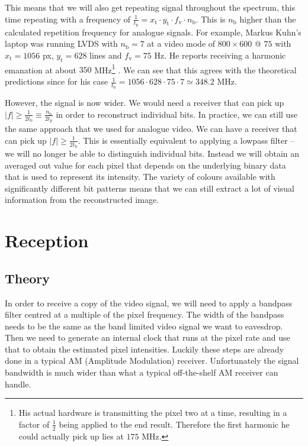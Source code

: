 \documentclass[a4paper,12pt,twoside,openright]{report}
\begin{document}
This means that we will also get repeating signal throughout the spectrum, this time repeating with a frequency of $\frac{1}{t_\text{b}} = x_\text{t} \cdot y_\text{t} \cdot f_\text{v} \cdot n_\text{b}$. This is $n_\text{b}$ higher than the calculated repetition frequency for analogue signals. For example, Markus Kuhn's laptop was running LVDS with $n_\text{b}=7$ at a video mode of $800 \times 600 $ @ $ 75$ with $x_\text{t} = 1056$ px, $y_\text{t} = 628$ lines and $f_\text{v} = 75$ Hz. He reports receiving a harmonic emanation at about $350$ MHz\footnote{His actual hardware is transmitting the pixel two at a time, resulting in a factor of $\frac{1}{2}$ being applied to the end result. Therefore the first harmonic he could actually pick up lies at $175$ MHz.} \cite{kuhn2005electromagnetic}. We can see that this agrees with the theoretical predictions since for his case $\frac{1}{t_\text{b}} = 1056 \cdot 628 \cdot 75 \cdot 7 \simeq 348.2$ MHz.

However, the signal is now wider. We would need a receiver that can pick up $|f| \geq \frac{1}{2 t_\text{b}} \equiv \frac{n_\text{b}}{2 t_\text{p}}$ in order to reconstruct individual bits. In practice, we can still use the same approach that we used for analogue video. We can have a receiver that can pick up $|f| \geq \frac{1}{2 t_\text{b}}$. This is essentially equivalent to applying a lowpass filter -- we will no longer be able to distinguish individual bits. Instead we will obtain an averaged out value for each pixel that depends on the underlying binary data that is used to represent its intensity. The variety of colours available with significantly different bit patterns means that we can still extract a lot of visual information from the reconstructed image.

\section{Reception}

\subsection{Theory}
In order to receive a copy of the video signal, we will need to apply a bandpass filter centred at a multiple of the pixel frequency. The width of the bandpass needs to be the same as the band limited video signal we want to eavesdrop. Then we need to generate an internal clock that runs at the pixel rate and use that to obtain the estimated pixel intensities. Luckily these steps are already done in a typical AM (Amplitude Modulation) receiver. Unfortunately the signal bandwidth is much wider than what a typical off-the-shelf AM receiver can handle.
\end{document}
